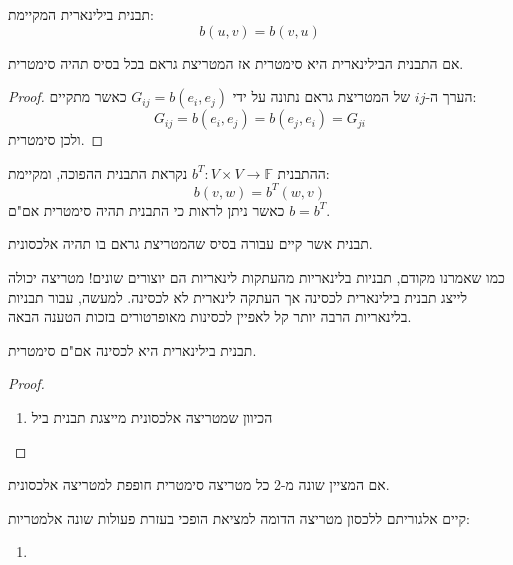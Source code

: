 \documentclass{tstextbook}
\begin{document}
\begin{definition}
תבנית בילינארית המקיימת:
$$b(u,v)=b(v,u)$$

\end{definition}
\begin{proposition}
אם התבנית הבילינארית היא סימטרית אז המטריצת גראם בכל בסיס תהיה סימטרית.

\end{proposition}
\begin{proof}
הערך ה-\(ij\) של המטריצת גראם נתונה על ידי \(G_{ij}=b(e_{i},e_{j})\) כאשר מתקיים:
$$G_{ij}=b(e_{i},e_{j})=b(e_{j},e_{i})=G_{ji}$$
ולכן סימטרית.

\end{proof}
\begin{definition}
ההתבנית \(b^{T}:V\times V\to \mathbb{F}\) נקראת התבנית ההפוכה, ומקיימת:
$$b(v,w)=b^{T}(w,v)$$
כאשר ניתן לראות כי התבנית תהיה סימטרית אם"ם \(b=b^{T}\).

\end{definition}
\begin{definition}
תבנית אשר קיים עבורה בסיס שהמטריצת גראם בו תהיה אלכסונית.

\end{definition}
\begin{remark}
כמו שאמרנו מקודם, תבניות בלינאריות מהעתקות לינאריות הם יוצורים שונים! מטריצה יכולה לייצג תבנית בילינארית לכסינה אך העתקה לינארית לא לכסינה. למעשה, עבור תבניות בלינאריות הרבה יותר קל לאפיין לכסינות מאופרטורים בזכות הטענה הבאה.

\end{remark}
\begin{proposition}
תבנית בילינארית היא לכסינה אם"ם סימטרית.

\end{proposition}
\begin{proof}
  \begin{enumerate}
    \item הכיוון שמטריצה אלכסונית מייצגת תבנית ביל 
  \end{enumerate}
\end{proof}
\begin{corollary}
אם המציין שונה מ-2 כל מטריצה סימטרית חופפת למטריצה אלכסונית.

\end{corollary}
\begin{proposition}
קיים אלגוריתם ללכסון מטריצה הדומה למציאת הופכי בעזרת פעולות שונה אלמטריות:

\end{proposition}
\begin{enumerate}
  \item 
\end{enumerate}
\end{document}
